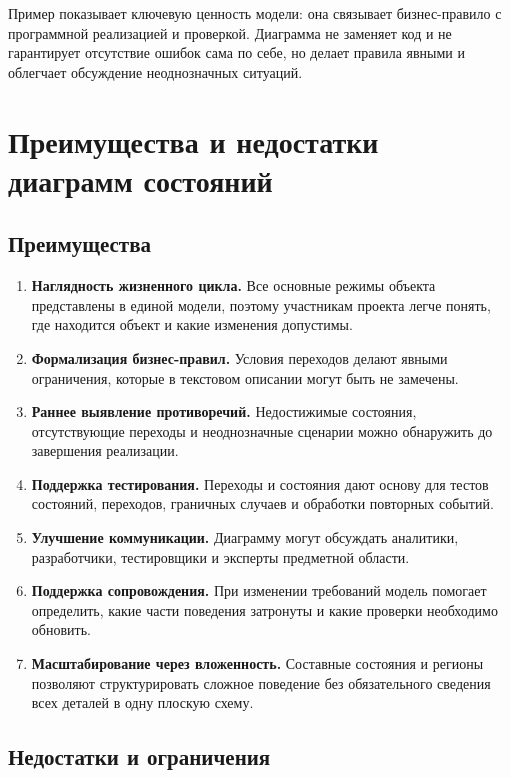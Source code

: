 \documentclass[essay,paper]{pmk-graduate}
\begin{document}
Пример показывает ключевую ценность модели: она связывает бизнес-правило с программной реализацией и проверкой. Диаграмма не заменяет код и не гарантирует отсутствие ошибок сама по себе, но делает правила явными и облегчает обсуждение неоднозначных ситуаций.

\section{Преимущества и недостатки диаграмм состояний}

\subsection{Преимущества}

\begin{enumerate}
  \item \textbf{Наглядность жизненного цикла.} Все основные режимы объекта представлены в единой модели, поэтому участникам проекта легче понять, где находится объект и какие изменения допустимы.
  \item \textbf{Формализация бизнес-правил.} Условия переходов делают явными ограничения, которые в текстовом описании могут быть не замечены.
  \item \textbf{Раннее выявление противоречий.} Недостижимые состояния, отсутствующие переходы и неоднозначные сценарии можно обнаружить до завершения реализации.
  \item \textbf{Поддержка тестирования.} Переходы и состояния дают основу для тестов состояний, переходов, граничных случаев и обработки повторных событий.
  \item \textbf{Улучшение коммуникации.} Диаграмму могут обсуждать аналитики, разработчики, тестировщики и эксперты предметной области.
  \item \textbf{Поддержка сопровождения.} При изменении требований модель помогает определить, какие части поведения затронуты и какие проверки необходимо обновить.
  \item \textbf{Масштабирование через вложенность.} Составные состояния и регионы позволяют структурировать сложное поведение без обязательного сведения всех деталей в одну плоскую схему.
\end{enumerate}

\subsection{Недостатки и ограничения}
\end{document}
